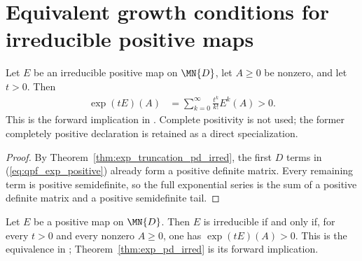 \section{Equivalent growth conditions for irreducible positive maps}


\begin{theorem}
    \label{thm:exp_pd_irred}
    \leanok
    Let $E$ be an irreducible positive map on $\MN{D}$,
    let $A \ge 0$ be nonzero, and let $t > 0$.
    Then
    \begin{align}
        \exp(tE)(A)
         & = \sum_{k=0}^{\infty}\frac{t^k}{k!}E^k(A)>0.
        \label{eq:qpf_exp_positive}
    \end{align}
    This is the forward implication in
    \cite[Theorem~6.2(3)]{Wolf2012Quantum}. Complete positivity is not used;
    the former completely positive declaration is retained as a direct
    specialization.
\end{theorem}

\begin{proof}
    \leanok
    By Theorem~\ref{thm:exp_truncation_pd_irred}, the first $D$ terms in
    (\ref{eq:qpf_exp_positive}) already form a positive definite matrix.
    Every remaining term is positive semidefinite, so the full exponential
    series is the sum of a positive definite matrix and a positive
    semidefinite tail.
\end{proof}

\begin{theorem}
    \label{thm:wolf_6_2_item_3}
    \leanok
    Let $E$ be a positive map on $\MN{D}$. Then $E$ is
    irreducible if and only if, for every $t>0$ and every nonzero
    $A\geq0$, one has $\exp(tE)(A)>0$.
    This is the equivalence in
    \cite[Theorem~6.2(3)]{Wolf2012Quantum};
    Theorem~\ref{thm:exp_pd_irred} is its forward implication.
\end{theorem}

